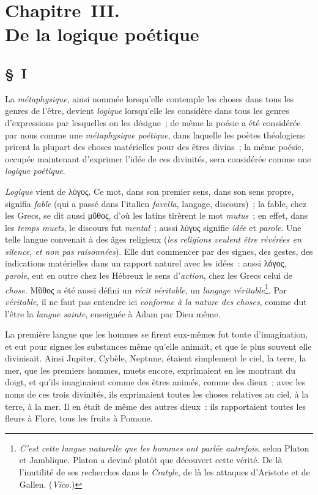 \documentclass[french,twoside]{book} %
\newcommand\chapteropen{} %
\newcommand\chaptercont{} %
\begin{document}
\chapteropen
\chapter[{Chapitre III. De la logique poétique}]{Chapitre III. \\
De la logique poétique}

\chaptercont
\section[{§ I}]{§ I}
\noindent  La {\itshape métaphysique}, ainsi nommée lorsqu’elle contemple les choses dans tous les genres de l’être, devient {\itshape logique} lorsqu’elle les considère dans tous les genres d’expressions par lesquelles on les désigne ; de même la poésie a été considérée par nous comme une {\itshape métaphysique poétique}, dans laquelle les poètes théologiens prirent la plupart des choses matérielles pour des êtres divins ; la même poésie, occupée maintenant d’exprimer l’idée de ces divinités, sera considérée comme une {\itshape logique poétique}.\par
{\itshape Logique} vient de λόγος. Ce mot, dans son premier sens, dans son sens propre, signifia {\itshape fable} (qui a passé dans l’italien {\itshape favella}, langage, discours) ; la fable, chez les Grecs, se dit aussi μῦθος, d’où les latins tirèrent le mot {\itshape mutus} ; en effet, dans les {\itshape temps muets}, le discours fut {\itshape mental} ; aussi λόγος signifie {\itshape idée}  et {\itshape parole}. Une telle langue convenait à des âges religieux ({\itshape les religions veulent être révérées en silence, et non pas raisonnées}). Elle dut commencer par des signes, des gestes, des indications matérielles dans un rapport naturel avec les idées : aussi λόγος, {\itshape parole}, eut en outre chez les Hébreux le sens d’{\itshape action}, chez les Grecs celui de {\itshape chose}. Μῦθος a été aussi défini un {\itshape récit véritable}, un {\itshape langage véritable}\footnote{{\itshape C’est cette langue naturelle que les hommes ont parlée autrefois}, selon Platon et Jamblique. Platon a deviné plutôt que découvert cette vérité. De là l’inutilité de ses recherches dans le {\itshape Cratyle}, de là les attaques d’Aristote et de Gallen. ({\itshape Vico.})}. Par {\itshape véritable}, il ne faut pas entendre ici {\itshape conforme à la nature des choses}, comme dut l’être la {\itshape langue sainte}, enseignée à Adam par Dieu même.\par
La première langue que les hommes se firent eux-mêmes fut toute d’imagination, et eut pour signes les substances même qu’elle animait, et que le plus souvent elle divinisait. Ainsi Jupiter, Cybèle, Neptune, étaient simplement le ciel, la terre, la mer, que les premiers hommes, muets encore, exprimaient en les montrant du doigt, et qu’ils imaginaient comme des êtres animés, comme des dieux ; avec les noms de ces trois divinités, ils exprimaient toutes les choses relatives au ciel, à la terre, à la mer. Il en était de même des autres dieux : ils rapportaient toutes les fleurs à Flore, tous les fruits à Pomone.\par
\end{document}
